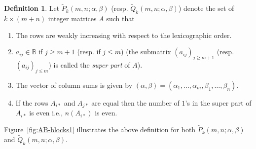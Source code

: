 \documentclass[12pt,reqno]{amsart}
\theoremstyle{definition}
\newtheorem{definition}[theorem]{Definition}
\theoremstyle{remark}
\begin{document}
\begin{definition}
    Let $\tilde{P}_{k}(m,n;\alpha,\beta)$ (resp. $\tilde{Q}_{k}(m,n;\alpha,\beta)$) denote the set of $k\times (m+n)$ integer matrices $A$ such that
    \begin{enumerate}
        \item The rows are weakly increasing with respect to the lexicographic order.
        \item $a_{ij}\in \mathbb{B}$ if $j\geq m+1$ (resp. if $j\leq m$) (the submatrix $(a_{ij})_{j\geq m+1}$ (resp. $(a_{ij})_{j\leq m}$) is called the \textit{super part} of $A$).
        \item The vector of column sums is given by $(\alpha,\beta)=(\alpha_{1},\dotsc,\alpha_{m},\beta_{1},\dotsc,\beta_{n})$.
        \item If the rows $A_{i*}$ and $A_{j*}$ are equal then the number of $1$'s in the super part of $A_{i*}$ is even i.e., $n(A_{i*})$ is even.
    \end{enumerate}
    Figure~\ref{fig:AB-blocks1} illustrates the above definition for both
    $\tilde{P}_{k}(m,n;\alpha,\beta)$ and $\tilde{Q}_{k}(m,n;\alpha,\beta)$.
\end{definition}
\end{document}
